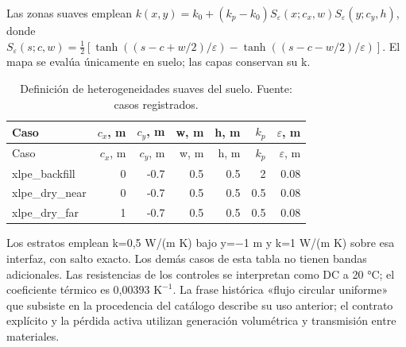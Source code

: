 Las zonas suaves emplean $k(x,y)=k_0+(k_p-k_0)S_\varepsilon(x;c_x,w)S_\varepsilon(y;c_y,h)$, donde $S_\varepsilon(s;c,w)=\tfrac12[\tanh((s-c+w/2)/\varepsilon)-\tanh((s-c-w/2)/\varepsilon)]$. El mapa se evalúa únicamente en suelo; las capas conservan su k.

\begingroup\footnotesize\setlength{\tabcolsep}{3pt}
\begin{longtable}{L{4.2cm}rrrrrr}
\caption{Definición de heterogeneidades suaves del suelo. Fuente: casos registrados.}\label{tab:explicit-patches}\\
\toprule
Caso & $c_x$, m & $c_y$, m & w, m & h, m & $k_p$ & $\varepsilon$, m\\
\midrule\endfirsthead
\toprule
Caso & $c_x$, m & $c_y$, m & w, m & h, m & $k_p$ & $\varepsilon$, m\\
\midrule\endhead
xlpe\_backfill & 0 & -0.7 & 0.5 & 0.5 & 2 & 0.08\\
xlpe\_dry\_near & 0 & -0.7 & 0.5 & 0.5 & 0.5 & 0.08\\
xlpe\_dry\_far & 1 & -0.7 & 0.5 & 0.5 & 0.5 & 0.08\\
\bottomrule\end{longtable}\endgroup

Los estratos emplean k=0,5 W/(m K) bajo y=−1 m y k=1 W/(m K) sobre esa interfaz, con salto exacto. Los demás casos de esta tabla no tienen bandas adicionales. Las resistencias de los controles se interpretan como DC a 20 °C; el coeficiente térmico es 0,00393 $\mathrm{K}^{-1}$. La frase histórica «flujo circular uniforme» que subsiste en la procedencia del catálogo describe su uso anterior; el contrato explícito y la pérdida activa utilizan generación volumétrica y transmisión entre materiales.
